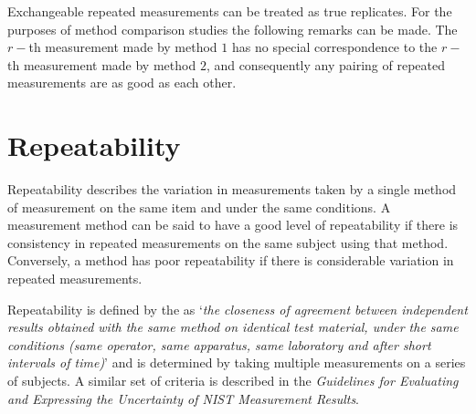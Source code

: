 \documentclass[12pt, a4paper]{report}
\theoremstyle{plain}
\theoremstyle{definition}
\theoremstyle{remark}
\begin{document}
	Exchangeable repeated measurements can be treated as true replicates. For the purposes of method comparison studies the following remarks can be made. The $r-$th measurement made by method $1$ has no special correspondence to the $r-$th measurement made by method $2$, and consequently any pairing of repeated measurements are as good as each other.
	
	

	
		
	
	
	
	
	

	
	
	
	\section{Repeatability}
	Repeatability describes the variation in measurements taken by a single method of measurement on the same item and under the same conditions. A measurement method can be said to have a good level of repeatability if there is consistency in repeated measurements on the same subject using that method. Conversely, a method has poor repeatability if there is considerable variation in repeated measurements.
		
		Repeatability is defined by the \citet{IUPAC} as `\textit{the closeness of agreement between independent results obtained with the same method on identical test material, under the same conditions (same
			operator, same apparatus, same laboratory and after short intervals of time)}'  and is determined by taking multiple measurements on a series of subjects.	A similar set of criteria is described in the \textit{Guidelines for Evaluating and Expressing the Uncertainty of NIST Measurement Results}.
%		
\end{document}
